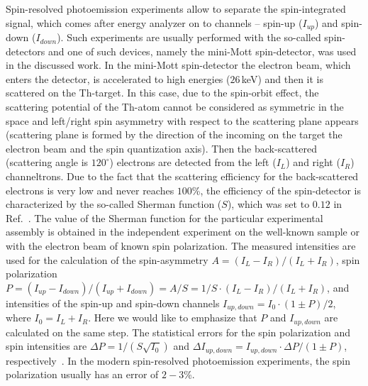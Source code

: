 \documentclass[twocolumn,preprintnumbers,amsmath,amssymb,prl]{revtex4}
\begin{document}
Spin-resolved photoemission experiments allow to separate the spin-integrated signal, which comes after energy analyzer on to channels -- spin-up ($I_{up}$) and spin-down ($I_{down}$). Such experiments are usually performed with the so-called spin-detectors and one of such devices, namely the mini-Mott spin-detector, was used in the discussed work. In the mini-Mott spin-detector the electron beam, which enters the detector, is accelerated to high energies ($26$\,keV) and then it is scattered on the Th-target. In this case, due to the spin-orbit effect, the scattering potential of the Th-atom cannot be considered as symmetric in the space and left/right spin asymmetry with respect to the scattering plane appears (scattering plane is formed by the direction of the incoming on the target the electron beam and the spin quantization axis). Then the back-scattered (scattering angle is $120^\circ$) electrons are detected from the left ($I_L$) and right ($I_R$) channeltrons. Due to the fact that the scattering efficiency for the back-scattered electrons is very low and never reaches $100$\%, the efficiency of the spin-detector is characterized by the so-called Sherman function ($S$), which was set to $0.12$ in Ref.~. The value of the Sherman function for the particular experimental assembly is obtained in the independent experiment on the well-known sample or with the electron beam of known spin polarization. The measured intensities are used for the calculation of the spin-asymmetry $A=(I_L-I_R)/(I_L+I_R)$, spin polarization $P=(I_{up}-I_{down})/(I_{up}+I_{down})=A/S=1/S\cdot(I_L-I_R)/(I_L+I_R)$, and intensities of the spin-up and spin-down channels $I_{up,down}=I_0\cdot(1\pm P)/2$, where $I_0=I_L+I_R$. Here we would like to emphasize that $P$ and $I_{up,down}$ are calculated on the same step. The statistical errors for the spin polarization and spin intensities are $\Delta P=1/(S\sqrt{I_0})$ and $\Delta I_{up,down}=I_{up,down}\cdot\Delta P/(1\pm P)$, respectively~\cite{Johnson:1992}. In the modern spin-resolved photoemission experiments, the spin polarization usually has an error of $2-3$\%.
\end{document}
